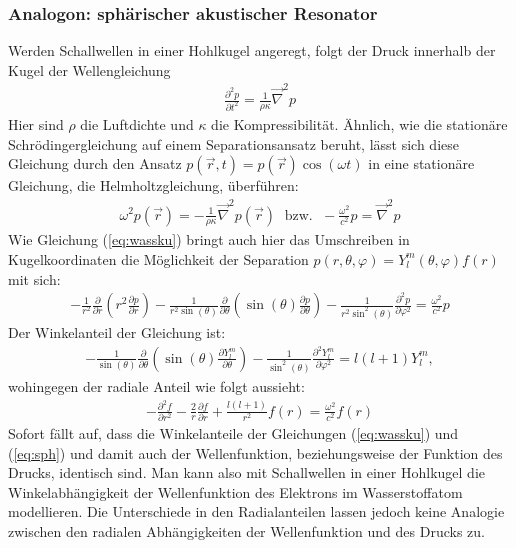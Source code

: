 \documentclass[numbers=noenddot,12pt,a4paper]{scrartcl}
\newcommand{\partiell}[2]{\frac{\partial #1}{\partial #2}}
\newcommand{\partiellz}[2]{\frac{\partial^2 #1}{\partial #2^2}}
\begin{document}
\subsubsection{Analogon: sphärischer akustischer Resonator}\label{ch:sph}
Werden Schallwellen in einer Hohlkugel angeregt, folgt der Druck innerhalb der Kugel der Wellengleichung
\begin{align}
\partiellz{p}{t}=\frac{1}{\rho\kappa}\vec{\nabla}^2p
\end{align}
Hier sind $\rho$ die Luftdichte und $\kappa$ die Kompressibilität. Ähnlich, wie die stationäre Schrödingergleichung auf einem Separationsansatz beruht, lässt sich diese Gleichung durch den Ansatz $p(\vec{r},t)=p(\vec{r})\cos(\omega t)$ in eine stationäre Gleichung, die Helmholtzgleichung, überführen:
\begin{align}
\omega^2p(\vec{r})=-\frac{1}{\rho\kappa}\vec{\nabla}^2p(\vec{r})\;\text{ bzw. }\;-\frac{\omega^2}{c^2}p=\vec{\nabla}^2p
\end{align}
Wie Gleichung (\ref{eq:wassku}) bringt auch hier das Umschreiben in Kugelkoordinaten die Möglichkeit der Separation $p(r,\theta,\varphi)=Y_l^m(\theta,\varphi)f(r)$ mit sich:
\begin{align}
-\frac{1}{r^2}\partiell{}{r}\left(r^2\partiell{p}{r}\right)-\frac{1}{r^2\sin(\theta)}\partiell{}{\theta}\left(\sin(\theta)\partiell{p}{\theta}\right)-\frac{1}{r^2\sin^2(\theta)}\partiellz{p}{\varphi}=\frac{\omega^2}{c^2}p\label{eq:sph}
\end{align}
Der Winkelanteil der Gleichung ist:
\begin{align}
-\frac{1}{\sin(\theta)}\partiell{}{\theta}\left(\sin(\theta)\partiell{Y_l^m}{\theta}\right)-\frac{1}{\sin^2(\theta)}\partiellz{Y_l^m}{\varphi}=l(l+1)Y_l^m,
\end{align}
wohingegen der radiale Anteil wie folgt aussieht:
\begin{align}
-\partiellz{f}{r}-\frac{2}{r}\partiell{f}{r}+\frac{l(l+1)}{r^2}f(r)=\frac{\omega^2}{c^2}f(r)
\end{align}
Sofort fällt auf, dass die Winkelanteile der Gleichungen (\ref{eq:wassku}) und (\ref{eq:sph}) und damit auch der Wellenfunktion, beziehungsweise der Funktion des Drucks, identisch sind. Man kann also mit Schallwellen in einer Hohlkugel die Winkelabhängigkeit der Wellenfunktion des Elektrons im Wasserstoffatom modellieren. Die Unterschiede in den Radialanteilen lassen jedoch keine Analogie zwischen den radialen Abhängigkeiten der Wellenfunktion und des Drucks zu.
\end{document}
